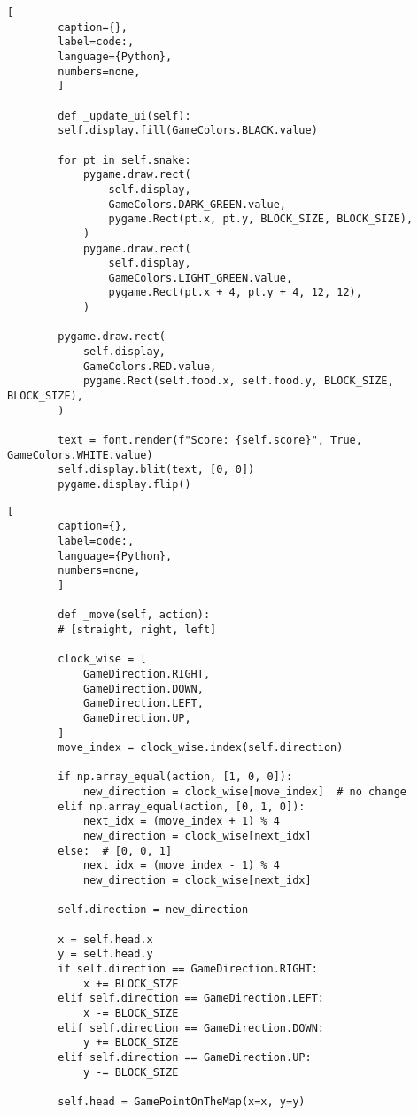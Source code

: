 \begin{onepage}
    \begin{lstlisting}[
        caption={},
        label=code:,
        language={Python},
        numbers=none,
        ]

        def _update_ui(self):
        self.display.fill(GameColors.BLACK.value)

        for pt in self.snake:
            pygame.draw.rect(
                self.display,
                GameColors.DARK_GREEN.value,
                pygame.Rect(pt.x, pt.y, BLOCK_SIZE, BLOCK_SIZE),
            )
            pygame.draw.rect(
                self.display,
                GameColors.LIGHT_GREEN.value,
                pygame.Rect(pt.x + 4, pt.y + 4, 12, 12),
            )

        pygame.draw.rect(
            self.display,
            GameColors.RED.value,
            pygame.Rect(self.food.x, self.food.y, BLOCK_SIZE, BLOCK_SIZE),
        )

        text = font.render(f"Score: {self.score}", True, GameColors.WHITE.value)
        self.display.blit(text, [0, 0])
        pygame.display.flip()

    \end{lstlisting}
\end{onepage}



\begin{onepage}
    \begin{lstlisting}[
        caption={},
        label=code:,
        language={Python},
        numbers=none,
        ]

        def _move(self, action):
        # [straight, right, left]

        clock_wise = [
            GameDirection.RIGHT,
            GameDirection.DOWN,
            GameDirection.LEFT,
            GameDirection.UP,
        ]
        move_index = clock_wise.index(self.direction)

        if np.array_equal(action, [1, 0, 0]):
            new_direction = clock_wise[move_index]  # no change
        elif np.array_equal(action, [0, 1, 0]):
            next_idx = (move_index + 1) % 4
            new_direction = clock_wise[next_idx]
        else:  # [0, 0, 1]
            next_idx = (move_index - 1) % 4
            new_direction = clock_wise[next_idx]

        self.direction = new_direction

        x = self.head.x
        y = self.head.y
        if self.direction == GameDirection.RIGHT:
            x += BLOCK_SIZE
        elif self.direction == GameDirection.LEFT:
            x -= BLOCK_SIZE
        elif self.direction == GameDirection.DOWN:
            y += BLOCK_SIZE
        elif self.direction == GameDirection.UP:
            y -= BLOCK_SIZE

        self.head = GamePointOnTheMap(x=x, y=y)
    \end{lstlisting}
\end{onepage}



